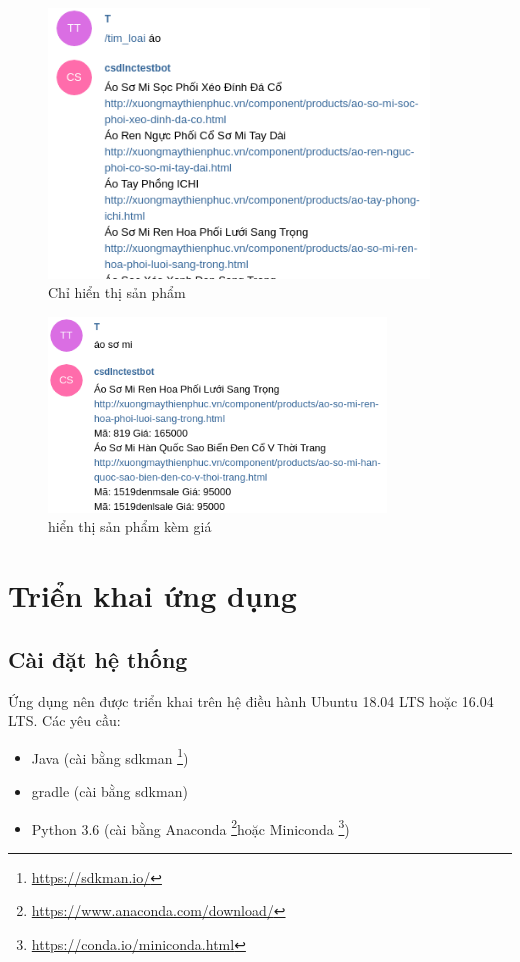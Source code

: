 \begin{figure}[H]
\centering
\includegraphics[width=0.9\textwidth]{imagev2/displayproduct.png}
\caption{\label{fig:displayproduct} Chỉ hiển thị sản phẩm}
\end{figure}

\begin{figure}[H]
\centering
\includegraphics[width=0.8\textwidth]{imagev2/displayproductitem.png}
\caption{\label{fig:displayproductitem} hiển thị sản phẩm kèm giá }
\end{figure}

\section{Triển khai ứng dụng}

\subsection{Cài đặt hệ thống}

Ứng dụng nên được triển khai trên hệ điều hành Ubuntu 18.04 LTS hoặc 16.04 LTS. Các yêu cầu: 

\begin{itemize}
\item Java (cài bằng sdkman \footnote{\url{https://sdkman.io/}})
\item gradle (cài bằng sdkman)
\item Python 3.6 (cài bằng Anaconda \footnote{\url{https://www.anaconda.com/download/}}hoặc Miniconda \footnote{\url{https://conda.io/miniconda.html}})
\end{itemize}

